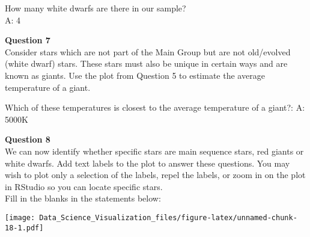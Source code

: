 \documentclass[]{article}
\newenvironment{Shaded}{\begin{snugshade}}{\end{snugshade}}
\newcommand{\CommentTok}[1]{\textcolor[rgb]{0.56,0.35,0.01}{\textit{#1}}}
\newcommand{\DataTypeTok}[1]{\textcolor[rgb]{0.13,0.29,0.53}{#1}}
\newcommand{\KeywordTok}[1]{\textcolor[rgb]{0.13,0.29,0.53}{\textbf{#1}}}
\newcommand{\NormalTok}[1]{#1}
\newcommand{\OperatorTok}[1]{\textcolor[rgb]{0.81,0.36,0.00}{\textbf{#1}}}
\newcommand{\StringTok}[1]{\textcolor[rgb]{0.31,0.60,0.02}{#1}}
\begin{document}
How many white dwarfs are there in our sample?\\
A: 4

\textbf{Question 7}\\
Consider stars which are not part of the Main Group but are not
old/evolved (white dwarf) stars. These stars must also be unique in
certain ways and are known as giants. Use the plot from Question 5 to
estimate the average temperature of a giant.

Which of these temperatures is closest to the average temperature of a
giant?: A: 5000K

\textbf{Question 8}\\
We can now identify whether specific stars are main sequence stars, red
giants or white dwarfs. Add text labels to the plot to answer these
questions. You may wish to plot only a selection of the labels, repel
the labels, or zoom in on the plot in RStudio so you can locate specific
stars.\\
Fill in the blanks in the statements below:

\begin{Shaded}
\end{Shaded}

\texttt{[image: Data\_Science\_Visualization\_files/figure-latex/unnamed-chunk-18-1.pdf]}

\begin{Shaded}
\end{Shaded}
\end{document}
